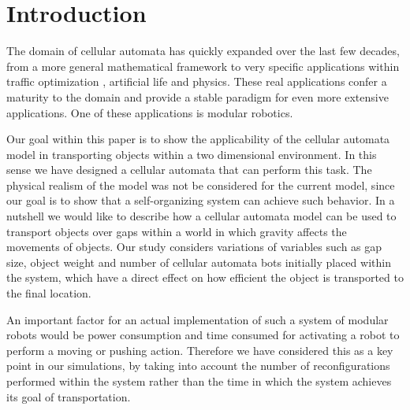 \section{Introduction}
\label{sec:intro}

The domain of cellular automata has quickly expanded over the last few decades, from a more general mathematical framework \cite{Neumann:1966:TSA:1102024} to very specific applications within traffic optimization \cite{ISI:A1995QH06900031,ISI:A1992KF03100005}, artificial life \cite{ISI:A1992JV77700063} and physics. These real applications confer a maturity to the domain and provide a stable paradigm for even more extensive applications. One of these applications is modular robotics.

Our goal within this paper is to show the applicability of the cellular automata model in transporting objects within a two dimensional environment. In this sense we have designed a cellular automata that can perform this task. The physical realism of the model was not be considered for the current model, since our goal is to show that a self-organizing system can achieve such behavior. In a nutshell we would like to describe how a cellular automata model can be used to transport objects over gaps within a world in which gravity affects the movements of objects. Our study considers variations of variables such as gap size, object weight and number of cellular automata bots initially placed within the system, which have a direct effect on how efficient the object is transported to the final location. 

An important factor for an actual implementation of such a system of modular robots would be power consumption and time consumed for activating a robot to perform a moving or pushing action. Therefore we have considered this as a key point in our simulations, by taking into account the number of reconfigurations performed within the system rather than the time in which the system achieves its goal of transportation. 
